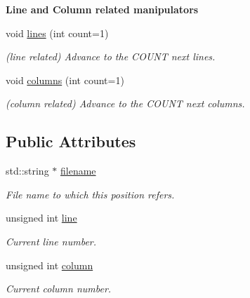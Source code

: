 \begin{Indent}{\bf Line and Column related manipulators}\par
\begin{DoxyCompactItemize}
\item 
void \hyperlink{classyy_1_1position_a4fbdd03b4e09fa8755d79d3e675d6d3a}{lines} (int count=1)\hypertarget{classyy_1_1position_a4fbdd03b4e09fa8755d79d3e675d6d3a}{}\label{classyy_1_1position_a4fbdd03b4e09fa8755d79d3e675d6d3a}

\begin{DoxyCompactList}\small\item\em (line related) Advance to the C\+O\+U\+NT next lines. \end{DoxyCompactList}\item 
void \hyperlink{classyy_1_1position_ab15e0388c4fd433aa19c2435e49f72e9}{columns} (int count=1)\hypertarget{classyy_1_1position_ab15e0388c4fd433aa19c2435e49f72e9}{}\label{classyy_1_1position_ab15e0388c4fd433aa19c2435e49f72e9}

\begin{DoxyCompactList}\small\item\em (column related) Advance to the C\+O\+U\+NT next columns. \end{DoxyCompactList}\end{DoxyCompactItemize}
\end{Indent}
\subsection*{Public Attributes}
\begin{DoxyCompactItemize}
\item 
std\+::string $\ast$ \hyperlink{classyy_1_1position_a88d2d070ec4751e5d5b1999bb2dc2116}{filename}\hypertarget{classyy_1_1position_a88d2d070ec4751e5d5b1999bb2dc2116}{}\label{classyy_1_1position_a88d2d070ec4751e5d5b1999bb2dc2116}

\begin{DoxyCompactList}\small\item\em File name to which this position refers. \end{DoxyCompactList}\item 
unsigned int \hyperlink{classyy_1_1position_aa3806654fd62786a0446a461d55755d6}{line}\hypertarget{classyy_1_1position_aa3806654fd62786a0446a461d55755d6}{}\label{classyy_1_1position_aa3806654fd62786a0446a461d55755d6}

\begin{DoxyCompactList}\small\item\em Current line number. \end{DoxyCompactList}\item 
unsigned int \hyperlink{classyy_1_1position_ada60c2dbba2e05705265f8359f722c4f}{column}\hypertarget{classyy_1_1position_ada60c2dbba2e05705265f8359f722c4f}{}\label{classyy_1_1position_ada60c2dbba2e05705265f8359f722c4f}

\begin{DoxyCompactList}\small\item\em Current column number. \end{DoxyCompactList}\end{DoxyCompactItemize}


